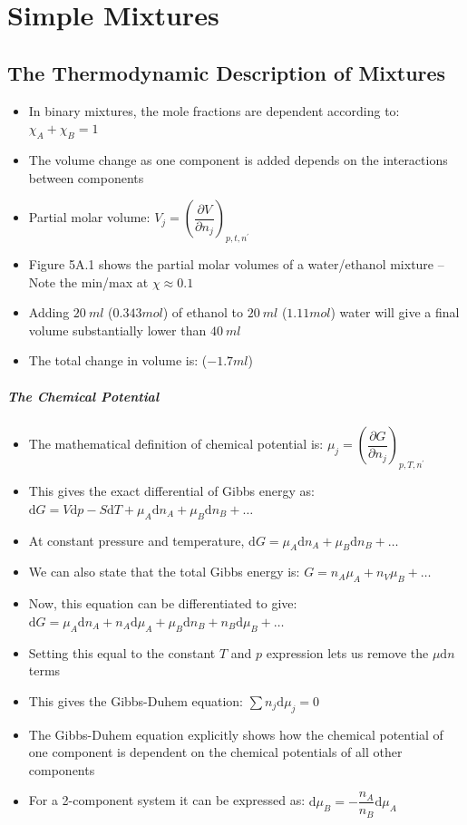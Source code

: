 \documentclass[12pt, openany, letterpaper]{memoir}
\begin{document}
\chapter{Simple Mixtures}
\section{The Thermodynamic Description of Mixtures}
\begin{itemize}
	\item In binary mixtures, the mole fractions are dependent according to: $\chi_A+\chi_B=1$
	\item The volume change as one component is added depends on the interactions between components
	\item Partial molar volume: $V_j=\left(\dfrac{\partial V}{\partial n_j}\right)_{p,t,n^\prime}$
	\item Figure 5A.1 shows the partial molar volumes of a water/ethanol mixture -- Note the min/max at $\chi\approx0.1$
	\item Adding $20~ml$ ($0.343 mol$) of ethanol to $20~ml$ ($1.11 mol$) water will give a final volume substantially lower than $40~ml$
	\item The total change in volume is: ($-1.7 ml$)
\end{itemize}
\paragraph{The Chemical Potential}
\begin{itemize}
	\item The mathematical definition of chemical potential is: $\mu_j = \left(\dfrac{\partial G}{\partial n_j}\right)_{p,T,n^\prime}$
	\item This gives the exact differential of Gibbs energy as: $\mathrm{d}G = V\mathrm{d}p-S\mathrm{d}T+\mu_A\mathrm{d}n_A+\mu_B\mathrm{d}n_B+\ldots$
	\item At constant pressure and temperature, $\mathrm{d}G = \mu_A\mathrm{d}n_A+\mu_B\mathrm{d}n_B+\ldots$
	\item We can also state that the total Gibbs energy is: $G = n_A\mu_A + n_V\mu_B+\ldots$
  \item Now, this equation can be differentiated to give: $\mathrm{d}G = \mu_A\mathrm{d}n_A + n_A\mathrm{d}\mu_A + \mu_B\mathrm{d}n_B + n_B\mathrm{d}\mu_B+\ldots$
	\item Setting this equal to the constant $T$ and $p$ expression lets us remove the $\mu\mathrm{d}n$ terms
	\item This gives the Gibbs-Duhem equation: $\displaystyle\sum n_j\mathrm{d}\mu_j = 0$
	\item The Gibbs-Duhem equation explicitly shows how the chemical potential of one component is dependent on the chemical potentials of all other components
  \item For a 2-component system it can be expressed as: $\mathrm{d}\mu_B = -\dfrac{n_A}{n_B}\mathrm{d}\mu_A$
\end{itemize}
\end{document}
